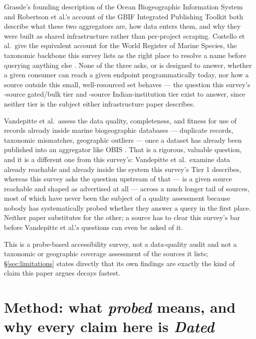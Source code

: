  Grassle's founding
description of the Ocean Biogeographic Information System \citep{grassle2000}
and Robertson et al.'s account of the GBIF Integrated Publishing Toolkit
\citep{robertson2014} both describe what these two aggregators are, how data
enters them, and why they were built as shared infrastructure rather than
per-project scraping. Costello et al.\ give the equivalent account for the
World Register of Marine Species, the taxonomic backbone this survey lists
as the right place to resolve a name before querying anything else
\citep{costello2013worms}. None of the three asks, or is designed to answer,
whether a given consumer can reach a given endpoint programmatically today,
nor how a source outside this small, well-resourced set behaves --- the
question this survey's \NTierTwo{}-source gated/bulk tier and
\NTierThree{}-source Indian-institution tier exist to answer, since neither
tier is the subject either infrastructure paper describes.

 Vandepitte et al.\ assess the data quality, completeness, and fitness for
use of records already inside marine biogeographic databases --- duplicate
records, taxonomic mismatches, geographic outliers --- once a dataset has
already been published into an aggregator like OBIS \citep{vandepitte2015}.
That is a rigorous, valuable question, and it is a different one from this
survey's: Vandepitte et al.\ examine data already reachable and already
inside the system this survey's Tier 1 describes, whereas this survey asks
the question upstream of that --- is a given source reachable and shaped as
advertised at all --- across a much longer tail of sources, most of which
have never been the subject of a quality assessment because nobody has
systematically probed whether they answer a query in the first place.
Neither paper substitutes for the other; a source has to clear this survey's
bar before Vandepitte et al.'s questions can even be asked of it.

 This is a probe-based accessibility survey, not a data-quality
audit and not a taxonomic or geographic coverage assessment of the sources it
lists; \S\ref{sec:limitations} states directly that its own findings are
exactly the kind of claim this paper argues decays fastest.

\section{Method: what \emph{probed} means, and why every claim here is
\emph{Dated}}
\label{sec:method}

